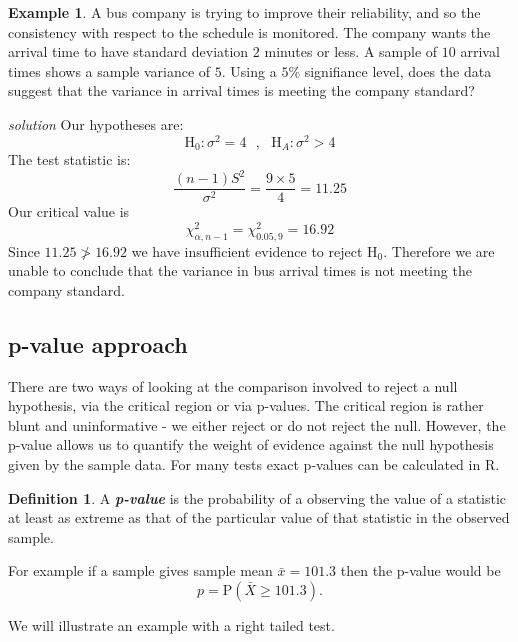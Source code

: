 \documentclass[
]{book}
\theoremstyle{definition}
\newtheorem{definition}{Definition}[chapter]
\theoremstyle{definition}
\newtheorem{example}{Example}[chapter]
\theoremstyle{definition}
\theoremstyle{definition}
\theoremstyle{remark}
\begin{document}
\begin{example}
A bus company is trying to improve their reliability, and so the consistency with respect to the schedule is monitored. The company wants the arrival time to have standard deviation \(2\) minutes or less. A sample of \(10\) arrival times shows a sample variance of \(5\). Using a \(5\%\) signifiance level, does the data suggest that the variance in arrival times is meeting the company standard?

\emph{solution}
Our hypotheses are:
\[\text{H}_0: \sigma^2=4 \ \ \ , \ \ \ \text{H}_A: \sigma^2 >4\]
The test statistic is:
\[\frac{(n-1)S^2}{\sigma^2}=\frac{9\times5}{4} = 11.25\]
Our critical value is
\[\chi^2_{\alpha,n-1}=\chi^2_{0.05,9}=16.92\]
Since \(11.25\ngtr16.92\) we have insufficient evidence to reject \(\text{H}_0\). Therefore we are unable to conclude that the variance in bus arrival times is not meeting the company standard.
\end{example}

\hypertarget{p-value-approach}{%
\subsection{p-value approach}\label{p-value-approach}}

There are two ways of looking at the comparison involved to reject a null hypothesis, via the critical region or via p-values. The critical region is rather blunt and uninformative - we either reject or do not reject the null. However, the p-value allows us to quantify the weight of evidence against the null hypothesis given by the sample data. For many tests exact p-values can be calculated in R.

\begin{definition}
A \textbf{\emph{p-value}} is the probability of a observing the value of a statistic at least as extreme as that of the particular value of that statistic in the observed sample.

For example if a sample gives sample mean \(\bar{x}=101.3\) then the p-value would be \[p  =\text{P}(\bar{X}\geq101.3).\]
\end{definition}

We will illustrate an example with a right tailed test.
\end{document}

